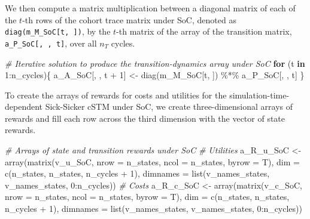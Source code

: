 \documentclass[
]{article}
\newenvironment{Shaded}{\begin{snugshade}}{\end{snugshade}}
\newcommand{\AttributeTok}[1]{\textcolor[rgb]{0.77,0.63,0.00}{#1}}
\newcommand{\CommentTok}[1]{\textcolor[rgb]{0.56,0.35,0.01}{\textit{#1}}}
\newcommand{\ControlFlowTok}[1]{\textcolor[rgb]{0.13,0.29,0.53}{\textbf{#1}}}
\newcommand{\DecValTok}[1]{\textcolor[rgb]{0.00,0.00,0.81}{#1}}
\newcommand{\FunctionTok}[1]{\textcolor[rgb]{0.00,0.00,0.00}{#1}}
\newcommand{\NormalTok}[1]{#1}
\newcommand{\OtherTok}[1]{\textcolor[rgb]{0.56,0.35,0.01}{#1}}
\newcommand{\SpecialCharTok}[1]{\textcolor[rgb]{0.00,0.00,0.00}{#1}}
\begin{document}
We then compute a matrix multiplication between a diagonal matrix of each of the \(t\)-th rows of the cohort trace matrix under SoC, denoted as \texttt{diag(m\_M\_SoC{[}t,\ {]})}, by the \(t\)-th matrix of the array of the transition matrix, \texttt{a\_P\_SoC{[},\ ,\ t{]}}, over all \(n_T\) cycles.

\begin{Shaded}
\begin{Highlighting}[]
\CommentTok{\# Iterative solution to produce the transition{-}dynamics array under SoC}
\ControlFlowTok{for}\NormalTok{ (t }\ControlFlowTok{in} \DecValTok{1}\SpecialCharTok{:}\NormalTok{n\_cycles)\{}
\NormalTok{  a\_A\_SoC[, , t }\SpecialCharTok{+} \DecValTok{1}\NormalTok{] }\OtherTok{\textless{}{-}} \FunctionTok{diag}\NormalTok{(m\_M\_SoC[t, ]) }\SpecialCharTok{\%*\%}\NormalTok{ a\_P\_SoC[, , t]}
\NormalTok{\}}
\end{Highlighting}
\end{Shaded}

To create the arrays of rewards for costs and utilities for the simulation-time-dependent Sick-Sicker cSTM under SoC, we create three-dimensional arrays of rewards and fill each row across the third dimension with the vector of state rewards.

\begin{Shaded}
\begin{Highlighting}[]
\CommentTok{\# Arrays of state and transition rewards under SoC}
\CommentTok{\# Utilities}
\NormalTok{a\_R\_u\_SoC }\OtherTok{\textless{}{-}} \FunctionTok{array}\NormalTok{(}\FunctionTok{matrix}\NormalTok{(v\_u\_SoC, }\AttributeTok{nrow =}\NormalTok{ n\_states, }\AttributeTok{ncol =}\NormalTok{ n\_states, }\AttributeTok{byrow =}\NormalTok{ T), }
                  \AttributeTok{dim =} \FunctionTok{c}\NormalTok{(n\_states, n\_states, n\_cycles }\SpecialCharTok{+} \DecValTok{1}\NormalTok{),}
                  \AttributeTok{dimnames =} \FunctionTok{list}\NormalTok{(v\_names\_states, v\_names\_states, }\DecValTok{0}\SpecialCharTok{:}\NormalTok{n\_cycles))}
\CommentTok{\# Costs}
\NormalTok{a\_R\_c\_SoC }\OtherTok{\textless{}{-}} \FunctionTok{array}\NormalTok{(}\FunctionTok{matrix}\NormalTok{(v\_c\_SoC, }\AttributeTok{nrow =}\NormalTok{ n\_states, }\AttributeTok{ncol =}\NormalTok{ n\_states, }\AttributeTok{byrow =}\NormalTok{ T), }
                  \AttributeTok{dim =} \FunctionTok{c}\NormalTok{(n\_states, n\_states, n\_cycles }\SpecialCharTok{+} \DecValTok{1}\NormalTok{),}
                  \AttributeTok{dimnames =} \FunctionTok{list}\NormalTok{(v\_names\_states, v\_names\_states, }\DecValTok{0}\SpecialCharTok{:}\NormalTok{n\_cycles))}
\end{Highlighting}
\end{Shaded}
\end{document}
